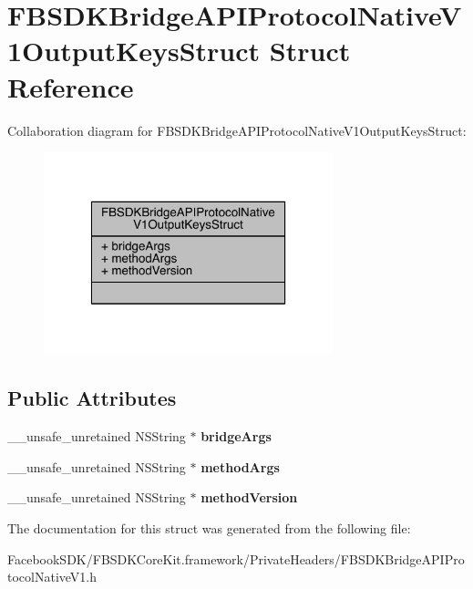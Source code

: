\hypertarget{struct_f_b_s_d_k_bridge_a_p_i_protocol_native_v1_output_keys_struct}{\section{F\-B\-S\-D\-K\-Bridge\-A\-P\-I\-Protocol\-Native\-V1\-Output\-Keys\-Struct Struct Reference}
\label{struct_f_b_s_d_k_bridge_a_p_i_protocol_native_v1_output_keys_struct}
}


Collaboration diagram for F\-B\-S\-D\-K\-Bridge\-A\-P\-I\-Protocol\-Native\-V1\-Output\-Keys\-Struct\-:
\nopagebreak
\begin{figure}[H]
\begin{center}
\leavevmode
\includegraphics[width=238pt]{struct_f_b_s_d_k_bridge_a_p_i_protocol_native_v1_output_keys_struct__coll__graph}
\end{center}
\end{figure}
\subsection*{Public Attributes}
\begin{DoxyCompactItemize}
\item 
\hypertarget{struct_f_b_s_d_k_bridge_a_p_i_protocol_native_v1_output_keys_struct_af6dd1f9c2e8d0b25fee10f183cf8a7e5}{\-\_\-\-\_\-unsafe\-\_\-unretained N\-S\-String $\ast$ {\bfseries bridge\-Args}}\label{struct_f_b_s_d_k_bridge_a_p_i_protocol_native_v1_output_keys_struct_af6dd1f9c2e8d0b25fee10f183cf8a7e5}

\item 
\hypertarget{struct_f_b_s_d_k_bridge_a_p_i_protocol_native_v1_output_keys_struct_a11695b19f5ae26ec22828fb728d6f225}{\-\_\-\-\_\-unsafe\-\_\-unretained N\-S\-String $\ast$ {\bfseries method\-Args}}\label{struct_f_b_s_d_k_bridge_a_p_i_protocol_native_v1_output_keys_struct_a11695b19f5ae26ec22828fb728d6f225}

\item 
\hypertarget{struct_f_b_s_d_k_bridge_a_p_i_protocol_native_v1_output_keys_struct_a43f53dd622610f7a51b6eefd132e81b5}{\-\_\-\-\_\-unsafe\-\_\-unretained N\-S\-String $\ast$ {\bfseries method\-Version}}\label{struct_f_b_s_d_k_bridge_a_p_i_protocol_native_v1_output_keys_struct_a43f53dd622610f7a51b6eefd132e81b5}

\end{DoxyCompactItemize}


The documentation for this struct was generated from the following file\-:\begin{DoxyCompactItemize}
\item 
Facebook\-S\-D\-K/\-F\-B\-S\-D\-K\-Core\-Kit.\-framework/\-Private\-Headers/F\-B\-S\-D\-K\-Bridge\-A\-P\-I\-Protocol\-Native\-V1.\-h\end{DoxyCompactItemize}
